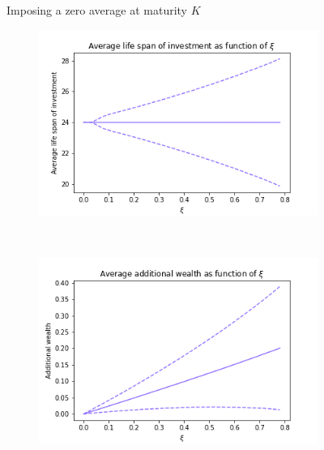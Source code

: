 \documentclass{article}
\begin{document}
\begin{figure}[b!]
\begin{subfigure}[b]{\textwidth}
         \caption{}
         \label{fig:average-final-wealth-zero-expected-shortfall}
     \end{subfigure}
        \caption{Imposing a zero average at maturity $K$}
        \label{fig:fixed-maturity}
\end{figure}

\begin{figure}[b!]
     \centering
     \hfill
     \begin{subfigure}[b]{\textwidth}
         \centering
         \includegraphics[scale=.7]{png/average_life_span__non_fixed_W0=1_r=0.005_m=0.02592451988463669_sigma=0.06164058158266796_K=24_S=100000.png}
         \caption{}
         \label{fig:average-final-wealth-zero-life-span}
     \end{subfigure}
     \\
     \begin{subfigure}[b]{\textwidth}
         \centering
         \includegraphics[scale=.7]{png/additional_wealth__non_fixed_W0=1_r=0.005_m=0.02592451988463669_sigma=0.06164058158266796_K=24_S=100000.png}
         \caption{}
         \label{fig:average-final-wealth-zero-additional wealth}

\end{subfigure}
\end{figure}
\end{document}
